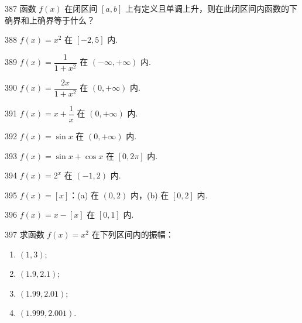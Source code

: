 \begin{prob}[S]{387}
函数 $f(x)$ 在闭区间 $[a, b]$ 上有定义且单调上升，则在此闭区间内函数的下确界和上确界等于什么？
\end{prob}


\begin{prob}[S]{388}
$f(x) = x^2$ 在 $[-2, 5]$ 内.
\end{prob}

\begin{prob}[S]{389}
$f(x) = \dfrac{1}{1 + x^2}$ 在 $(-\infty, +\infty)$ 内.
\end{prob}

\begin{prob}[S]{390}
$f(x) = \dfrac{2x}{1 + x^2}$ 在 $(0, +\infty)$ 内.
\end{prob}

\begin{prob}[S]{391}
$f(x) = x + \dfrac{1}{x}$ 在 $(0, +\infty)$ 内.
\end{prob}

\begin{prob}[S]{392}
$f(x) = \sin x$ 在 $(0, +\infty)$ 内.
\end{prob}

\begin{prob}[S]{393}
$f(x) = \sin x + \cos x$ 在 $[0, 2\pi]$ 内.
\end{prob}

\begin{prob}[S]{394}
$f(x) = 2^x$ 在 $(-1, 2)$ 内.
\end{prob}

\begin{prob}[M]{395}
$f(x) = [x]$：(a) 在 $(0, 2)$ 内，(b) 在 $[0, 2]$ 内.
\end{prob}

\begin{prob}[S]{396}
$f(x) = x - [x]$ 在 $[0, 1]$ 内.
\end{prob}

\begin{prob}[L]{397}
求函数 $f(x) = x^2$ 在下列区间内的振幅：
\begin{enumerate}[label=(\alph*), itemsep=2pt, topsep=3pt]
  \item $(1, 3)$;
  \item $(1.9, 2.1)$;
  \item $(1.99, 2.01)$;
  \item $(1.999, 2.001)$.
\end{enumerate}
\end{prob}

